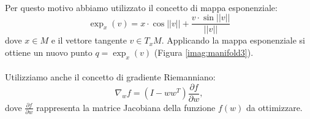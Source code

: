 \documentclass[final]{siamltex}
\begin{document}
%
\\Per questo motivo abbiamo utilizzato il concetto di mappa esponenziale:
%
\begin{equation} 
\label{eq:manifold1}
\exp_x(v)=x\cdot \cos ||v||+ \frac{v\cdot \sin ||v||}{||v||} 
\end{equation}
%
dove $x \in M$ e il vettore tangente $v \in T_xM$. Applicando la mappa esponenziale si ottiene un nuovo punto $q= \exp_x(v)$ (Figura \ref{imag:manifold3}). \\
\\
Utilizziamo anche il concetto di gradiente Riemanniano:
%
{\begin{equation}
\label{eq:manifold2}
\nabla_w f = \left(I - ww^T \right) \frac{\partial f}{\partial w},
\end{equation}
%
dove $\frac{\partial f}{\partial w}$ rappresenta la matrice Jacobiana della funzione $f(w)$ da ottimizzare.\\

}
\end{document}
